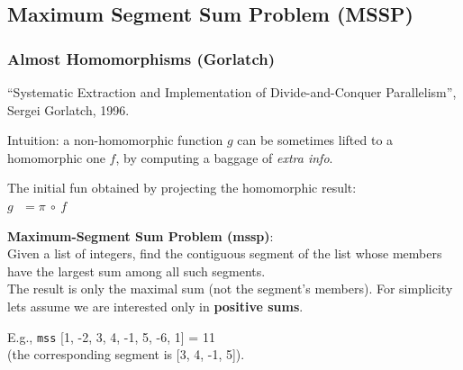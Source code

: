 \documentclass{beamer}
\renewcommand{\emph}[1]{\textcolor{CosGreen}{ #1}}
\newcommand{\emp}[1]{\textcolor{DikuRed}{ #1}}
\begin{document}
\subsection{Maximum Segment Sum Problem (MSSP)}

\begin{frame}[fragile,t]
  \frametitle{Almost Homomorphisms (Gorlatch)}

\emp{``Systematic Extraction and Implementation of Divide-and-Conquer Parallelism'', Sergei Gorlatch, 1996.} 
\bigskip

\emph{Intuition}: a non-homomorphic function $g$ can be sometimes lifted 
to a homomorphic one $f$, by computing a baggage of \emp{\em extra info}. 

\bigskip

The initial fun obtained by projecting the homomorphic result:\\
$g\mbox{ }=\pi~\circ~f$

\bigskip

\emp{\bf Maximum-Segment Sum Problem ({\sc mssp})}: \\
Given a list of integers, find the contiguous segment of the list 
whose members have the largest sum among all such segments.\\
The result is only the maximal sum (not the segment's members).
For simplicity lets assume we are interested only in {\bf positive sums}.

\bigskip

E.g., {\tt mss} [1, -2, 3, 4, -1, 5, -6, 1] = 11 \\
(the corresponding segment is [3, 4, -1, 5]). 

\end{frame}
\end{document}

